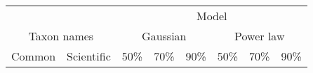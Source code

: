 \begin{landscape}
\begin{table}
\begin{center}
\begin{tabular}{ll*{6}{r@{ (}r@{, }r}}
\toprule
                             &  & \multicolumn{18}{c}{Model} \\ \cmidrule(lr){3-20}
\multicolumn{2}{c}{Taxon names} & \multicolumn{9}{c}{Gaussian} & \multicolumn{9}{c}{Power law} \\  \cmidrule(lr){1-2}  \cmidrule(lr){3-11}  \cmidrule(lr){12-20}
Common & Scientific             & \multicolumn{3}{c}{50\%} & \multicolumn{3}{c}{70\%} & \multicolumn{3}{c}{90\%} & \multicolumn{3}{c}{50\%} & \multicolumn{3}{c}{70\%} & \multicolumn{3}{c}{90\%} \\
\cmidrule(lr){1-1} \cmidrule(lr){2-2} \cmidrule(lr){3-5} \cmidrule(lr){6-8} \cmidrule(lr){9-11} \cmidrule(lr){12-14} \cmidrule(lr){15-17} \cmidrule(lr){18-20}

\end{tabular}
\end{center}
\end{table}
\end{landscape}

